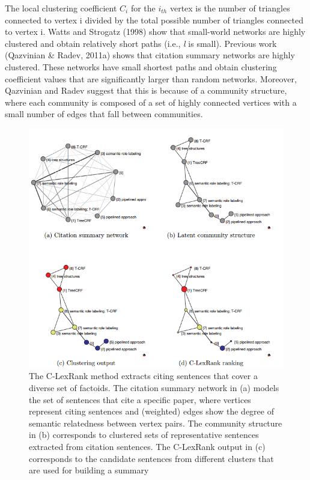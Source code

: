 The local clustering coefficient $C_i$ for the $i_{th}$ vertex is the number of triangles connected
to vertex i divided by the total possible number of triangles connected to vertex i. Watts
and Strogatz (1998) show that small-world networks are highly clustered and obtain relatively
short paths (i.e., \textit{l} is small). Previous work (Qazvinian \& Radev, 2011a) shows that
citation summary networks are highly clustered. These networks have small shortest paths
and obtain clustering coefficient values that are significantly larger than random networks.
Moreover, Qazvinian and Radev suggest that this is because of a community structure, where each community is composed of a set of highly connected vertices with a small number
of edges that fall between communities.

\begin{figure}[!htbp]
\centering
\includegraphics[width=15cm]{fig3lexRank.png}
\caption{ The C-LexRank method extracts citing sentences that cover a diverse set of factoids.
The citation summary network in (a) models the set of sentences that cite
a specific paper, where vertices represent citing sentences and (weighted) edges
show the degree of semantic relatedness between vertex pairs. The community
structure in (b) corresponds to clustered sets of representative sentences extracted
from citation sentences. The C-LexRank output in (c) corresponds to the candidate
sentences from different clusters that are used for building a summary}
\label{cLexRank}
\end{figure}


